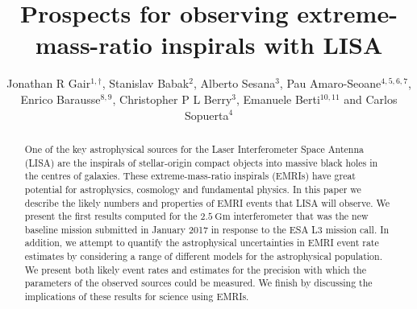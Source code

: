 \documentclass[a4paper]{jpconf}
\begin{document}
\title{Prospects for observing extreme-mass-ratio inspirals with LISA}

\author{Jonathan R Gair$^{1,\dag}$, Stanislav Babak$^2$, Alberto Sesana$^3$, Pau Amaro-Seoane$^{4,5,6,7}$, Enrico Barausse$^{8,9}$, Christopher P L Berry$^3$, Emanuele Berti$^{10,11}$ and Carlos Sopuerta$^4$}

\address{$^1$School of Mathematics, University of Edinburgh, The King's Buildings,
Peter Guthrie Tait Road, Edinburgh, EH9 3FD, UK}
\address{$^2$Max Planck Institute for Gravitational Physics, Albert Einstein Institute, Am M\"{u}hlenberg 1, 14476 Golm, Germany}
\address{$^3$School of Physics and Astronomy, University of Birmingham, Edgbaston, Birmingham B15 2TT, UK}
\address{$^4$Institut de Ci\`{e}ncies de l'Espai (CSIC-IEEC), Campus UAB, Carrer de Can Magrans s/n, 08193 Cerdanyola del Vall\`{e}s, Spain}
\address{$^5$Kavli Institute for Astronomy and Astrophysics, Beijing 100871, China}
\address{$^6$Institute of Applied Mathematics, Academy of Mathematics and Systems Science, CAS, Beijing 100190, China}
\address{$^7$Zentrum f{\"u}r Astronomie und Astrophysik, TU Berlin, Hardenbergstra{\ss}e 36, 10623 Berlin, Germany}
\address{$^8$Sorbonne Universit\'{e}s, UPMC Univesit\'{e} Paris 6, UMR 7095, Institut d'Astrophysique de Paris, 98 bis Bd Arago, 75014 Paris, France}
\address{$^9$CNRS, UMR 7095, Institut d'Astrophysique de Paris, 98 bis Bd Arago, 75014 Paris, France}
\address{$^{10}$Department of Physics and Astronomy, The University of Mississippi, University, MS 38677, USA}
\address{$^{11}$CENTRA, Departamento de F\'isica, Instituto SuperiorT\'ecnico, Universidade de Lisboa, Avenida Rovisco Pais 1, 1049 Lisboa, Portugal}


\begin{abstract}
One of the key astrophysical sources for the Laser Interferometer Space Antenna (LISA) are the inspirals of stellar-origin compact objects into massive black holes in the centres of galaxies. These extreme-mass-ratio inspirals (EMRIs) have great potential for astrophysics, cosmology and fundamental physics. In this paper we describe the likely numbers and properties of EMRI events that LISA will observe. We present the first results computed for the $2.5~\mathrm{Gm}$ interferometer that was the new baseline mission submitted in January 2017 in response to the ESA L3 mission call. In addition, we attempt to quantify the astrophysical uncertainties in EMRI event rate estimates by considering a range of different models for the astrophysical population. We present both likely event rates and estimates for the precision with which the parameters of the observed sources could be measured. We finish by discussing the implications of these results for science using EMRIs.
\end{abstract}
\end{document}
